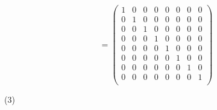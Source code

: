 \documentclass[12pt]{article}
\begin{document}
\[
=
\begin{pmatrix}
1  & 0 & 0          & 0          & 0          & 0          & 0          & 0          \\
0 & 1  & 0          & 0          & 0          & 0          & 0          & 0          \\
0          & 0          & 1  & 0  & 0          & 0          &  0          & 0          \\
0          & 0          & 0  & 1 & 0          & 0          & 0          & 0          \\
0          & 0          & 0          & 0          & 1  & 0  & 0          & 0          \\
0          & 0          & 0          & 0          & 0  & 1  & 0          & 0          \\
0          & 0          & 0          & 0          & 0          & 0          & 1  & 0  \\
0          & 0          & 0          & 0          & 0          & 0             & 0  &  1\\ 
\end{pmatrix}
\] 

\medskip
(3) \\%
\end{document}
